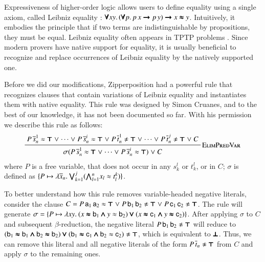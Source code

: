 Expressiveness of higher-order logic allows users to define equality using a single axiom,
called Leibniz equality \cite{pa-01-classical-ty-thy}:
%
$ \pmb{\forall} xy. \,
   (\pmb{\forall} p. \, p \, x \pmb{\rightarrow} p \, y) \pmb{\rightarrow} x \pmb{\approx} y$.
%
Intuitively, it embodies the principle that if two terms are indistinguishable by propositions,
they must be equal.
Leibniz equality often appears in TPTP problems  \cite{gs-17-tptp}. Since modern provers have native support
for equality, it is usually beneficial to recognize and replace occurrences of Leibniz equality by the natively
supported one.

Before we did our modifications, Zipperposition had a powerful rule that
recognizes clauses that contain variations of Leibniz equality and instantiates
them with native equality. This rule was designed by Simon Cruanes, and to the
best of our knowledge, it has not been documented so far. With his permission
we describe this rule as follows:
\pagebreak[2]
%
$$\namedinference{ElimPredVar}{P \, \overline{s}_n^1 \eq \itrue \llor \cdots \llor
    P \, \overline{s}_n^i \eq \itrue \llor P \, \overline{t}_n^1 \noteq \itrue \llor
    \cdots \llor P \, \overline{t}_n^j \noteq \itrue \llor C} 
    {\sigmacl{P \, \overline{s}_n^1
    \eq \itrue \llor \cdots \llor P \, \overline{s}_n^i \eq \itrue} \llor C} $$
where $P$ is a free variable, that does not occur in any $s_k^l$ or $t_k^l$, or
in $C$; $\sigma$ is defined as $\{ P \mapsto \lambda \overline{x}_{n}.\> \pmb{\bigvee}_{k=1}^{j}
(\pmb{\bigwedge}_{l=1}^{n} x_l \approx t^k_l )  \}$. 

To better understand how this rule removes variable-headed negative literals,
consider the clause $C = P \, \mathsf{a}_1 \, \mathsf{a}_2 \approx \pmb{\top} \mathrel\lor P \,
\mathsf{b}_1 \, \mathsf{b}_2 \not\approx \pmb{\top} \mathrel\lor P \, \mathsf{c}_1 \, \mathsf{c}_2 \not\approx
\pmb{\top}$. The rule 
will generate $\sigma = \{ P \mapsto \lambda xy.\> (x \pmb{\approx} \mathsf{b}_1
\pmb{\land} y \approx \mathsf{b}_2) \pmb{\lor} (x \pmb{\approx} \mathsf{c}_1 \pmb{\land} y \pmb{\approx} \mathsf{c}_2)   \}$.
After applying $\sigma$ to $C$ and subsequent $\beta$-reduction, the negative literal
$  P \, \mathsf{b}_1 \, \mathsf{b}_2 \not\approx \pmb{\top}$ will reduce to 
$ (\cst{b}_1 \ieq \cst{b}_1 \iand \cst{b}_2 \ieq \cst{b}_2) \ior (\cst{b}_1 \ieq \cst{c}_1 \iand \cst{b}_2 \eq \cst{c}_2) \noteq \itrue $,
which is equivalent to $\pmb{\bot}$. Thus, we can remove this literal and all negative literals
of the form $P \, \overline{t}_n \noteq \itrue$ from $C$ and apply $\sigma$ to the remaining ones.

